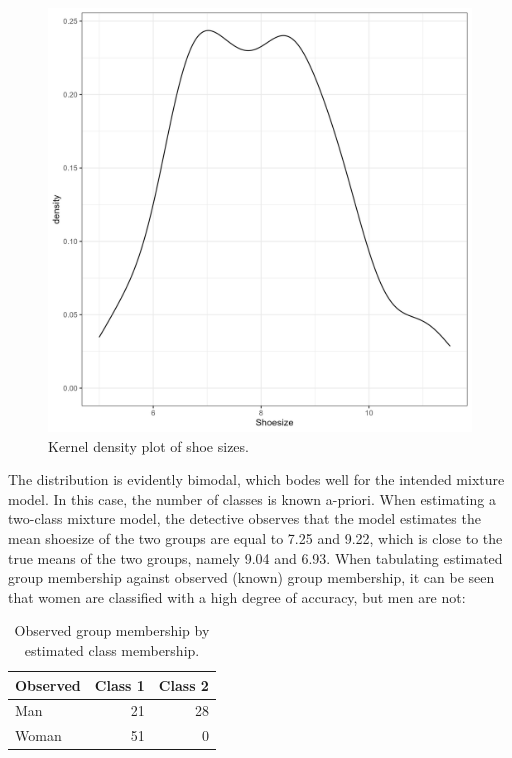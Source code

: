 \documentclass[
  ,man]{apa6}
\begin{document}
\begin{figure}
\includegraphics[width=7in]{shoedens} \caption{Kernel density plot of shoe sizes.}\label{fig:shoedens}
\end{figure}

The distribution is evidently bimodal, which bodes well for the intended mixture model.
In this case, the number of classes is known a-priori.
When estimating a two-class mixture model, the detective observes that the model estimates
the mean shoesize of the two groups are equal to 7.25 and 9.22,
which is close to the true means of the two groups, namely 9.04 and 6.93.
When tabulating estimated group membership against observed (known) group membership, it can be seen that women are classified with a high degree of accuracy, but men are not:

\begin{table}

\caption{\label{tab:tabshoe}Observed group membership by estimated class membership.}
\centering
\begin{tabular}[t]{l|r|r}
\hline
Observed & Class 1 & Class 2\\
\hline
Man & 21 & 28\\
\hline
Woman & 51 & 0\\
\hline
\end{tabular}
\end{table}
\end{document}
